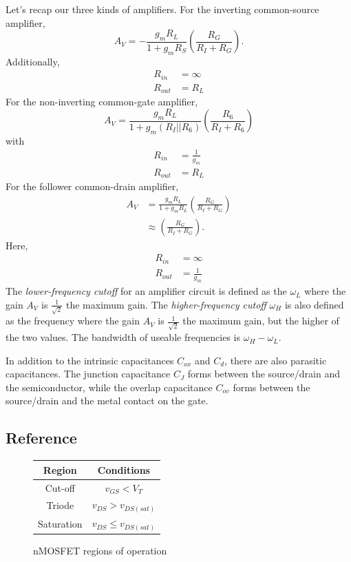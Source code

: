 \documentclass[nobib]{tufte-handout}
\begin{document}
Let's recap our three kinds of amplifiers.
For the inverting common-source amplifier, 
\begin{equation} \label{eq:29}
    A_V = -\frac{g_m R_L}{1 + g_m R_S} \left(\frac{R_G}{R_I+R_G}\right).
\end{equation}
Additionally, 
\begin{align} \label{eq:30}
    R_{in} &= \infty \\
    R_{out} &= R_L
\end{align}
For the non-inverting common-gate amplifier, 
\begin{equation} \label{eq:31}
    A_V = \frac{g_m R_L}{1 + g_m(R_I || R_6)} \left(\frac{R_6}{R_I+R_6}\right)
\end{equation}
with 
\begin{align} \label{eq:32}
    R_{in} &= \frac{1}{g_m} \\
    R_{out} &= R_L 
\end{align}
For the follower common-drain amplifier, 
\begin{align} \label{eq:33}
    A_V &= \frac{g_m R_L}{1 + g_m R_L} \left(\frac{R_G}{R_I+R_G}\right) \\
    &\approx \left(\frac{R_G}{R_I + R_G}\right). 
\end{align}
Here, 
\begin{align} \label{eq:34}
    R_{in} &= \infty \\
    R_{out} &= \frac{1}{g_m}
\end{align}
The \emph{lower-frequency cutoff} for an 
amplifier circuit is defined as the $\omega_L$ 
where the gain $A_V$ is $\frac{1}{\sqrt{2}}$
the maximum gain. The \emph{higher-frequency cutoff} $\omega_H$
is also defined as the frequency
where the gain $A_V$ is $\frac{1}{\sqrt{2}}$
the maximum gain, but the higher of the two 
values. 
The bandwidth of useable frequencies is 
$\omega_H - \omega_L$. 

In addition to the intrinsic capacitances $C_{ox}$
and $C_d$, there are also parasitic capacitances. 
The junction capacitance $C_J$ forms between the 
source/drain and the semiconductor, while the 
overlap capacitance $C_{ov}$ forms between the 
source/drain and the metal contact on the gate. 

\subsection{Reference}

\begin{figure}
    \begin{center}
        \begin{tabular}{ c | c }
            Region & Conditions \\
            \hline
            Cut-off & $v_{GS} < V_T$ \\
            Triode & $v_{DS} > v_{DS(sat)}$\\
            Saturation & $v_{DS} \leq v_{DS(sat)}$\\
            \hline
        \end{tabular}
    \end{center}
    \caption{nMOSFET regions of operation}
    \label{tab:nMOSFET regions}
\end{figure}
\end{document}
